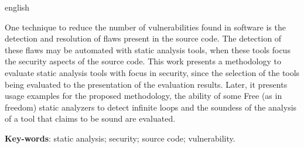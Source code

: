 \begin{resumo}[Abstract]
 \begin{otherlanguage*}{english}

   One technique to reduce the number of vulnerabilities found in software is
   the detection and resolution of flaws present in the source code.
   The detection of these flaws may be automated with static analysis tools,
   when these tools focus the security aspects of the source code. This work
   presents a methodology to evaluate static analysis tools with focus in
   security, since the selection of the tools being evaluated to the
   presentation of the evaluation results. Later, it presents usage examples
   for the proposed methodology, the ability of some Free (as in freedom) static
   analyzers to detect infinite loops and the soundess of the analysis of a tool
   that claims to be sound are evaluated. 

   \vspace{\onelineskip}
 
   \noindent 
   \textbf{Key-words}: static analysis; security; source code; vulnerability.
 \end{otherlanguage*}
\end{resumo}
